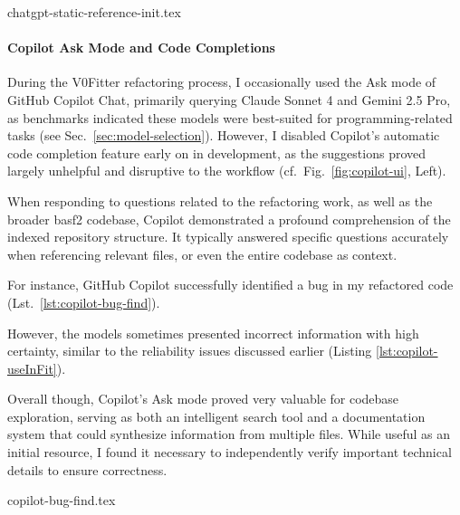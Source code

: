 \begin{lstbox}{%
    \label{lst:chatgpt-static-reference-init}
  }
  {chatgpt-static-reference-init.tex}
\end{lstbox}%

\paragraph{Copilot Ask Mode and Code Completions}

During the V0Fitter refactoring process, I occasionally used the Ask mode of GitHub Copilot Chat, primarily querying Claude Sonnet 4 and Gemini 2.5 Pro, as benchmarks indicated these models were best-suited for programming-related tasks (see Sec.\ \ref{sec:model-selection}).
However, I disabled Copilot's automatic code completion feature early on in development, as the suggestions proved largely unhelpful and disruptive to the workflow (cf.\ Fig.\ \ref{fig:copilot-ui}, Left).

When responding to questions related to the refactoring work, as well as the broader basf2 codebase, Copilot demonstrated a profound comprehension of the indexed repository structure.
It typically answered specific questions accurately when referencing relevant files, or even the entire codebase as context.

For instance, GitHub Copilot successfully identified a bug in my refactored code (Lst.\ \ref{lst:copilot-bug-find}).

However, the models sometimes presented incorrect information with high certainty, similar to the reliability issues discussed earlier (Listing \ref{lst:copilot-useInFit}).

Overall though, Copilot's Ask mode proved very valuable for codebase exploration, serving as both an intelligent search tool and a documentation system that could synthesize information from multiple files.
While useful as an initial resource, I found it necessary to independently verify important technical details to ensure correctness.

\begin{lstbox}{%
    \label{lst:copilot-bug-find}
  }
  {copilot-bug-find.tex}
\end{lstbox}%

